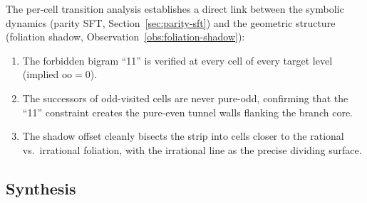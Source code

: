 \documentclass[11pt,a4paper]{article}
\theoremstyle{plain}
\theoremstyle{definition}
\begin{document}
\begin{keyinsight}[SFT--tunnel correspondence at $k = 729$]
    The per-cell transition analysis establishes a direct link between
    the symbolic dynamics (parity SFT, Section~\ref{sec:parity-sft})
    and the geometric structure (foliation shadow,
    Observation~\ref{obs:foliation-shadow}):
    \begin{enumerate}[label=(\roman*)]
        \item The forbidden bigram ``11'' is verified at every cell
              of every target level (implied $\mathrm{oo} = 0$).
        \item The successors of odd-visited cells are never pure-odd,
              confirming that the ``11'' constraint creates the
              pure-even tunnel walls flanking the branch core.
        \item The shadow offset cleanly bisects the strip into cells
              closer to the rational vs.\ irrational foliation,
              with the irrational line as the precise dividing surface.
    \end{enumerate}
\end{keyinsight}


\subsection{Synthesis}
\end{document}
